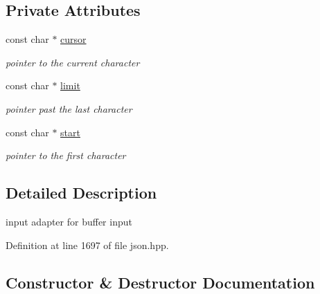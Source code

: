 \subsection*{Private Attributes}
\begin{DoxyCompactItemize}
\item 
const char $\ast$ \hyperlink{classnlohmann_1_1detail_1_1input__buffer__adapter_a49e6c8b6555af489a45ef51737eafa1c}{cursor}
\begin{DoxyCompactList}\small\item\em pointer to the current character \end{DoxyCompactList}\item 
const char $\ast$ \hyperlink{classnlohmann_1_1detail_1_1input__buffer__adapter_a14e1f701754e9cc819af0fc883e6e139}{limit}
\begin{DoxyCompactList}\small\item\em pointer past the last character \end{DoxyCompactList}\item 
const char $\ast$ \hyperlink{classnlohmann_1_1detail_1_1input__buffer__adapter_a028e9bb232143d8a2b6b204fa28c3493}{start}
\begin{DoxyCompactList}\small\item\em pointer to the first character \end{DoxyCompactList}\end{DoxyCompactItemize}


\subsection{Detailed Description}
input adapter for buffer input 

Definition at line 1697 of file json.\+hpp.



\subsection{Constructor \& Destructor Documentation}
\mbox{\label{classnlohmann_1_1detail_1_1input__buffer__adapter_aee9d094d369bcd8f110eae4a175a8fa9}} 

